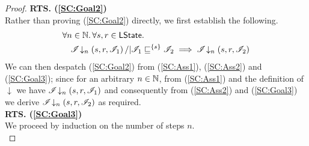 \begin{lemma}
\begin{proof}
%
%
%
%

\noindent\textbf{RTS. (\ref{SC:Goal2})} \\
Rather than proving (\ref{SC:Goal2}) directly, we first establish the following.
%
\begin{align}
	& \forall n \in \mathbb{N}.\, \forall s, r \in \textsf{LState}.\, \nonumber\\
	& \quad \mathscr{I} \!\downarrow_{n} \left(s, r, \mathscr{I}_1\right) /| \mathscr{I}_1 \sqsubseteq^{\{s\}} \mathscr{I}_2 \implies \mathscr{I} \!\downarrow_{n} \left(s, r, \mathscr{I}_2\right) \label{SC:Goal3}
\end{align}
%
We can then despatch (\ref{SC:Goal2}) from (\ref{SC:Ass1}), (\ref{SC:Ass2}) and (\ref{SC:Goal3}); since for an arbitrary $n \in \mathbb{N}$, from (\ref{SC:Ass1}) and the definition of $\downarrow$ we have $\mathscr{I} \!\downarrow_{n} \left(s, r, \mathscr{I}_1\right)$ and consequently from (\ref{SC:Ass2}) and (\ref{SC:Goal3}) we derive $\mathscr{I} \!\downarrow_{n} \left(s, r, \mathscr{I}_2\right) $ as required. \\

\noindent\textbf{RTS. (\ref{SC:Goal3})} \\
We proceed by induction on the number of steps $n$.\\


\end{proof}
\end{lemma}

